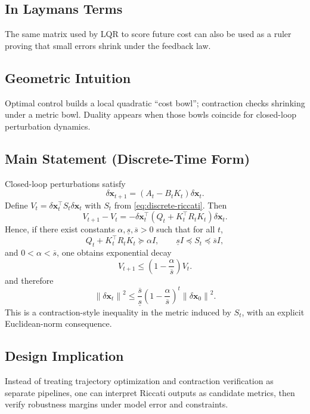 \documentclass[11pt,letterpaper]{article}
\newcommand{\norm}[1]{\left\lVert #1 \right\rVert}
\newcommand{\dx}{\delta\mathbf{x}}
\begin{document}
\subsection{In Laymans Terms}
The same matrix used by LQR to score future cost can also be used as a ruler proving that small errors shrink under the feedback law.

\subsection{Geometric Intuition}
Optimal control builds a local quadratic ``cost bowl''; contraction checks shrinking under a metric bowl. Duality appears when those bowls coincide for closed-loop perturbation dynamics.

\subsection{Main Statement (Discrete-Time Form)}
Closed-loop perturbations satisfy
\begin{equation}
\dx_{t+1} = (A_t-B_tK_t)\dx_t.
\label{eq:closed-loop-perturbation}
\end{equation}
Define $V_t = \dx_t^\top S_t\dx_t$ with $S_t$ from \eqref{eq:discrete-riccati}. Then
\begin{equation}
V_{t+1} - V_t
= -\dx_t^\top(Q_t + K_t^\top R_t K_t)\dx_t.
\label{eq:value-drop}
\end{equation}
Hence, if there exist constants $\alpha,\underline{s},\overline{s}>0$ such that for all $t$,
\begin{equation}
Q_t + K_t^\top R_t K_t \succeq \alpha I,
\qquad
\underline{s}I \preceq S_t \preceq \overline{s}I,
\label{eq:duality-bounds}
\end{equation}
and $0<\alpha<\overline{s}$, one obtains exponential decay
\begin{equation}
V_{t+1} \le \left(1-\frac{\alpha}{\overline{s}}\right)V_t.
\label{eq:discrete-exp-decay}
\end{equation}
and therefore
\begin{equation}
\norm{\dx_t}^2
\le
\frac{\overline{s}}{\underline{s}}
\left(1-\frac{\alpha}{\overline{s}}\right)^t
\norm{\dx_0}^2.
\label{eq:state-norm-decay}
\end{equation}
This is a contraction-style inequality in the metric induced by $S_t$, with an explicit Euclidean-norm consequence.

\subsection{Design Implication}
Instead of treating trajectory optimization and contraction verification as separate pipelines, one can interpret Riccati outputs as candidate metrics, then verify robustness margins under model error and constraints.
\end{document}
